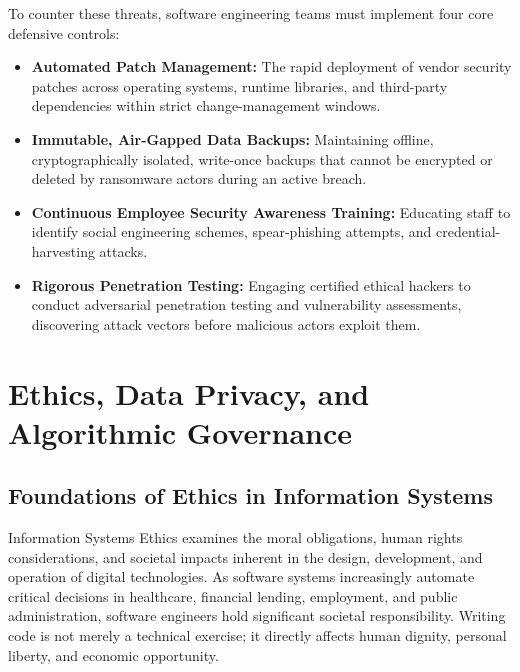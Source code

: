 \documentclass[11pt,a4paper]{article}
\begin{document}
To counter these threats, software engineering teams must implement four core defensive controls:
\begin{itemize}
    \item \textbf{Automated Patch Management:} The rapid deployment of vendor security patches across operating systems, runtime libraries, and third-party dependencies within strict change-management windows.
    \item \textbf{Immutable, Air-Gapped Data Backups:} Maintaining offline, cryptographically isolated, write-once backups that cannot be encrypted or deleted by ransomware actors during an active breach.
    \item \textbf{Continuous Employee Security Awareness Training:} Educating staff to identify social engineering schemes, spear-phishing attempts, and credential-harvesting attacks.
    \item \textbf{Rigorous Penetration Testing:} Engaging certified ethical hackers to conduct adversarial penetration testing and vulnerability assessments, discovering attack vectors before malicious actors exploit them.
\end{itemize}

\section{Ethics, Data Privacy, and Algorithmic Governance}
\label{sec:ethics}

\subsection{Foundations of Ethics in Information Systems}
Information Systems Ethics examines the moral obligations, human rights considerations, and societal impacts inherent in the design, development, and operation of digital technologies. As software systems increasingly automate critical decisions in healthcare, financial lending, employment, and public administration, software engineers hold significant societal responsibility. Writing code is not merely a technical exercise; it directly affects human dignity, personal liberty, and economic opportunity.
\end{document}
